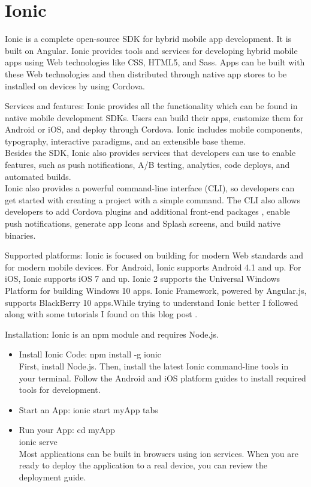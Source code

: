 \section{Ionic}
Ionic is a complete open-source SDK for hybrid mobile app development. It is built on Angular. Ionic provides tools and services for developing hybrid mobile apps using Web technologies like CSS, HTML5, and Sass. Apps can be built with these Web technologies and then distributed through native app stores to be installed on devices by using Cordova.
\item Services and features: Ionic provides all the functionality which can be found in native mobile development SDKs. Users can build their apps, customize them for Android or iOS, and deploy through Cordova. Ionic includes mobile components, typography, interactive paradigms, and an extensible base theme. \\ Besides the SDK, Ionic also provides services that developers can use to enable features, such as push notifications, A/B testing, analytics, code deploys, and automated builds. \\ Ionic also provides a powerful command-line interface (CLI), so developers can get started with creating a project with a simple command. The CLI also allows developers to add Cordova plugins and additional front-end packages \cite{7}, enable push notifications, generate app Icons and Splash screens, and build native binaries. \\
\item Supported platforms: Ionic is focused on building for modern Web standards and for modern mobile devices. For Android, Ionic supports Android 4.1 and up. For iOS, Ionic supports iOS 7 and up. Ionic 2 supports the Universal Windows Platform for building Windows 10 apps. Ionic Framework, powered by Angular.js, supports BlackBerry 10 apps.While trying to understand Ionic better I followed along with some tutorials I found on this blog post \cite{joshmorony}. \\
\item Installation: Ionic is an npm module and requires Node.js.
\begin{itemize}
\\ \item Install Ionic Code: npm install -g ionic \\ First, install Node.js. Then, install the latest Ionic command-line tools in your terminal. Follow the Android and iOS platform guides to install required tools for development. \\ 
\item Start an App: ionic start myApp tabs
\item Run your App: cd myApp \\ ionic serve \\ Most applications can be built in browsers using ion services. When you are ready to deploy the application to a real device, you can review the deployment guide.
\end{itemize}




